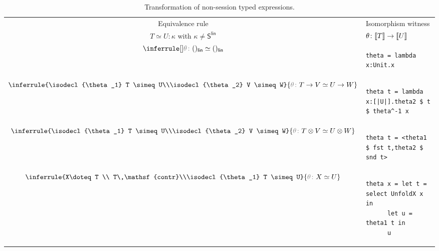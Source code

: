 \begin{table}
\begin{tabular}{| c | l |}
\hline
Equivalence rule & Isomorphism witness\\
$T\simeq U \colon \kappa$ with $\kappa\neq \mathsf{S^{lin}}$&$\theta \colon {\color{black}{\llbracket {T} \rrbracket}} \rightarrow {\color{black}{\llbracket {U} \rrbracket}}$\\\hline
$\axiom{}{\isodecl{\theta} ()_{\mathsf{lin}}\simeq ()_{\mathsf{lin}}}$ & 
\begin{lstlisting}
theta = lambda x:Unit.x
\end{lstlisting}
\\\hline
$\inferrule{\isodecl{\theta_1} T \simeq U\\\isodecl{\theta_2} V \simeq W}{\isodecl{\theta} T\rightarrow V \simeq U \rightarrow W}$ & 
\begin{lstlisting}
theta t = lambda x:[|U|].theta2 $ t $ theta^-1 x
\end{lstlisting}
 \\\hline
$\inferrule{\isodecl{\theta_1} T \simeq U\\\isodecl{\theta_2} V \simeq W}{\isodecl{\theta} T\otimes V \simeq U \otimes W}$&
\begin{lstlisting}
theta t = <theta1 $ fst t,theta2 $ snd t> 
\end{lstlisting}
 \\\hline
$\inferrule{X\doteq T \\ T\,\mathsf{contr}\\\isodecl{\theta_1} T \simeq U}{\isodecl{\theta} X \simeq U}$ & 
\begin{lstlisting}
theta x = let t = select UnfoldX x in 
      let u = theta1 t in
      u
\end{lstlisting}
 \\\hline
\end{tabular}
\caption{Transformation of non-session typed expressions.}
\label{tab:iso-cfst-to-algst-f}
\end{table}

